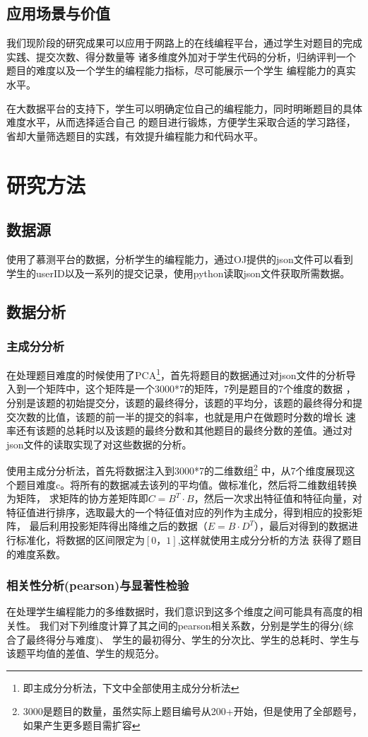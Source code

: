 \documentclass[UTF8]{ctexart}
\begin{document}
\subsection{应用场景与价值}
我们现阶段的研究成果可以应用于网路上的在线编程平台，通过学生对题目的完成实践、提交次数、得分数量等
诸多维度外加对于学生代码的分析，归纳评判一个题目的难度以及一个学生的编程能力指标，尽可能展示一个学生
编程能力的真实水平。

在大数据平台的支持下，学生可以明确定位自己的编程能力，同时明晰题目的具体难度水平，从而选择适合自己
的题目进行锻炼，方便学生采取合适的学习路径，省却大量筛选题目的实践，有效提升编程能力和代码水平。
\section{研究方法}
\subsection{数据源}
使用了慕测平台的数据，分析学生的编程能力，通过OJ提供的json文件可以看到学生的userID以及一系列的提交记录，使用python读取json文件获取所需数据。
\subsection{数据分析}
\subsubsection{主成分分析}
在处理题目难度的时候使用了PCA\footnote{即主成分分析法，下文中全部使用主成分分析法}，首先将题目的数据通过对json文件的分析导入到一个矩阵中，这个矩阵是一个3000*7的矩阵，7列是题目的7个维度的数据
，分别是该题的初始提交分，该题的最终得分，该题的平均分，该题的最终得分和提交次数的比值，该题的前一半的提交的斜率，也就是用户在做题时分数的增长
速率还有该题的总耗时以及该题的最终分数和其他题目的最终分数的差值。通过对json文件的读取实现了对这些数据的分析。

使用主成分分析法，首先将数据注入到3000*7的二维数组\footnote{3000是题目的数量，虽然实际上题目编号从200+开始，但是使用了全部题号，如果产生更多题目需扩容}
中，从7个维度展现这个题目难度c。将所有的数据减去该列的平均值。做标准化，然后将二维数组转换为矩阵，
求矩阵的协方差矩阵即$C=B^T \cdot B$，然后一次求出特征值和特征向量，对特征值进行排序，选取最大的一个特征值对应的列作为主成分，得到相应的投影矩阵，
最后利用投影矩阵得出降维之后的数据（$E = B \cdot D^T$），最后对得到的数据进行标准化，将数据的区间限定为$[0，1]$,这样就使用主成分分析的方法
获得了题目的难度系数。
\subsubsection{相关性分析(pearson)与显著性检验}
在处理学生编程能力的多维数据时，我们意识到这多个维度之间可能具有高度的相关性。
我们对下列维度计算了其之间的pearson相关系数，分别是学生的得分(综合了最终得分与难度)、
学生的最初得分、学生的分次比、学生的总耗时、学生与该题平均值的差值、学生的规范分。
\end{document}
